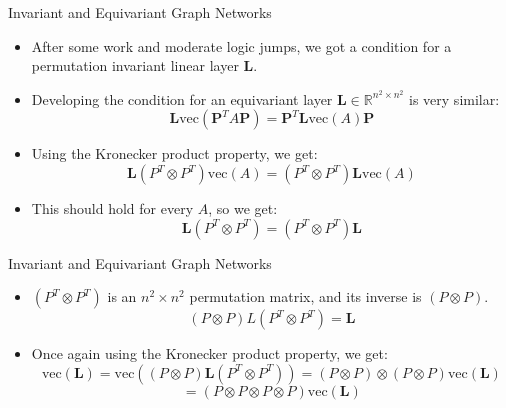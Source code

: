\documentclass{beamer}
\begin{document}
\begin{frame}{Invariant and Equivariant Graph Networks}
    \begin{itemize}
        \setlength{\itemsep}{\fill}
        \item After some work and moderate logic jumps, we got a condition for a permutation invariant linear layer $\mathbf{L}$.
        \item Developing the condition for an equivariant layer $\mathbf{L} \in \mathbb{R}^{n^2 \times n^2}$ is very similar:
        \[ \mathbf{L}\text{vec}(\boldsymbol{P}^T A\boldsymbol{P}) =\boldsymbol{P}^T \mathbf{L}\text{vec}(A) \boldsymbol{P}\]
        \item Using the Kronecker product property, we get:
        \[ \mathbf{L}(P^T\otimes P^T)\text{vec}(A) = (P^T\otimes P^T)\mathbf{L}\text{vec}(A) \]
        \item This should hold for every $A$, so we get:
        \[ \mathbf{L}(P^T\otimes P^T) = (P^T\otimes P^T)\mathbf{L} \]
    \end{itemize}
\end{frame}
\begin{frame}{Invariant and Equivariant Graph Networks}
    \begin{itemize}
        \setlength{\itemsep}{\fill}
        \item $(P^T\otimes P^T)$ is an $n^2 \times n^2$ permutation matrix, and its inverse is $(P\otimes P)$.
        \[ (P\otimes P)L(P^T\otimes P^T) = \mathbf{L} \]
        \item Once again using the Kronecker product property, we get:
        \[ \text{vec}(\mathbf{L}) = \text{vec}\left((P\otimes P)\mathbf{L}(P^T\otimes P^T)\right) = (P\otimes P) \otimes (P \otimes P) \text{vec}(\mathbf{L}) \]
        \[ = (P \otimes P \otimes P \otimes P) \text{vec}(\mathbf{L}) \]
        
        
    \end{itemize}
\end{frame}
\end{document}
